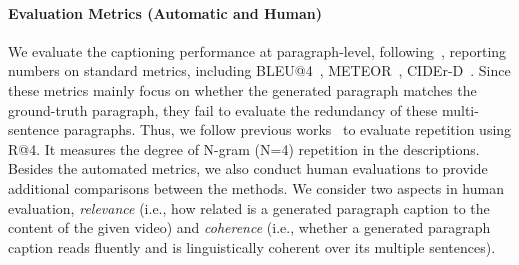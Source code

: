 \documentclass[11pt,a4paper]{article}
\begin{document}
\paragraph{Evaluation Metrics (Automatic and Human)} 
We evaluate the captioning performance at paragraph-level, following~\cite{park2019adversarial, Xiong2018MoveFA}, reporting numbers on standard metrics, including BLEU@4~\cite{papineni2002bleu},  METEOR~\cite{denkowski2014meteor}, CIDEr-D~\cite{vedantam2015cider}. 
Since these metrics mainly focus on whether the generated paragraph matches the ground-truth paragraph, they fail to evaluate the redundancy of these multi-sentence paragraphs. 
Thus, we follow previous works~\cite{park2019adversarial, Xiong2018MoveFA} to evaluate repetition using R@4. It measures the degree of N-gram (N=4) repetition in the descriptions. 
Besides the automated metrics, we also conduct human evaluations to provide additional comparisons between the methods. We consider two aspects in human evaluation, \textit{relevance} (i.e., how related is a generated paragraph caption to the content of the given video) and \textit{coherence} (i.e., whether a generated paragraph caption reads fluently and is linguistically coherent over its multiple sentences).


\begin{table*}[!t]
\centering
\small
{}
\caption{Comparison with transformer baselines on ActivityNet Captions \textit{ae-test} split and YouCookII \textit{val} split. Re. indicates whether sentence-level recurrence is used. We report BLEU@4 (B@4), METEOR (M), CIDEr-D (C) and Repetition (R@4). \textit{VTransformer} denotes vanilla transformer.
} 
\label{tab:main_res}
\end{table*}
\end{document}
